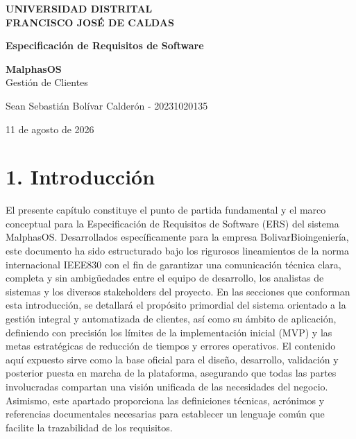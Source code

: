 \documentclass[12pt,a4paper]{article}
\newcommand{\sectiontitle}[1]{%
  \section*{#1}
  \addcontentsline{toc}{section}{#1}
}
\begin{document}
\begin{titlepage}
  \centering
  \vspace*{2cm}

  {\Large\textbf{UNIVERSIDAD DISTRITAL}\\
   \textbf{FRANCISCO JOSÉ DE CALDAS}}\par

  \vspace{3cm}

  {\Huge\textbf{Especificación de Requisitos de Software}}\par

  \vspace{2cm}

  {\Large\textbf{MalphasOS}}\\
  {\large Gestión de Clientes}\par

  \vspace{3cm}

  {\large Sean Sebastián Bolívar Calderón - 20231020135}\par

  \vfill

  {\large 11 de agosto de 2026}
\end{titlepage}

\tableofcontents
\newpage

\sectiontitle{1. Introducción}

El presente capítulo constituye el punto de partida fundamental y el marco conceptual para la Especificación de Requisitos de Software (ERS) del sistema MalphasOS. Desarrollados específicamente para la empresa BolivarBioingeniería, este documento ha sido estructurado bajo los rigurosos lineamientos de la norma internacional IEEE830 con el fin de garantizar una comunicación técnica clara, completa y sin ambigüedades entre el equipo de desarrollo, los analistas de sistemas y los diversos stakeholders del proyecto. En las secciones que conforman esta introducción, se detallará el propósito primordial del sistema orientado a la gestión integral y automatizada de clientes, así como su ámbito de aplicación, definiendo con precisión los límites de la implementación inicial (MVP) y las metas estratégicas de reducción de tiempos y errores operativos. El contenido aquí expuesto sirve como la base oficial para el diseño, desarrollo, validación y posterior puesta en marcha de la plataforma, asegurando que todas las partes involucradas compartan una visión unificada de las necesidades del negocio. Asimismo, este apartado proporciona las definiciones técnicas, acrónimos y referencias documentales necesarias para establecer un lenguaje común que facilite la trazabilidad de los requisitos.
\end{document}
